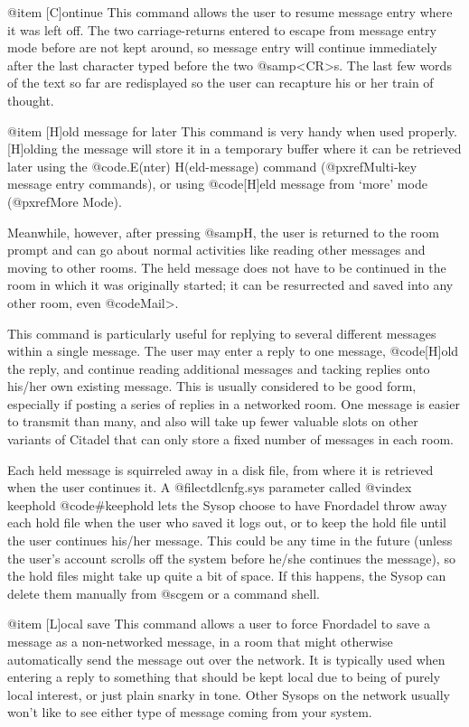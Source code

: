 @item [C]ontinue
This command allows the user to resume message entry
where it was left off.  The two carriage-returns entered to
escape from message entry mode before are not kept around,
so message entry will continue immediately after the last
character typed before the two @samp{<CR>}s.  The last few words of
the text so far are redisplayed so the user can recapture
his or her train of thought.

@item [H]old message for later
This command is very handy when used properly.
[H]olding the message
will store it in a temporary buffer where it can be retrieved
later using the @code{.E(nter) H(eld-message)} command (@pxref{Multi-key
message entry commands}), or using @code{[H]eld message} from `more' mode
(@pxref{More Mode}).

Meanwhile, however, after pressing @samp{H}, the user is
returned to the room prompt and can go about normal activities
like reading other messages and moving to other rooms.  The
held message does not have to be continued in the room in
which it was originally started; it can be resurrected and
saved into any other room, even @code{Mail>}.

This command is particularly useful for replying to
several different messages within a single message.  The user
may enter a reply to one message, @code{[H]old} the reply, and
continue reading additional messages and tacking replies
onto his/her own existing message.  This is usually considered to
be good form, especially if posting a series of replies in a
networked room.  One message is easier to transmit than many,
and also will take up fewer valuable slots on other variants of Citadel
that can only store a fixed number of messages in each room.

Each held message is squirreled away in a disk file,
from where it is retrieved when the user continues it.  A
@file{ctdlcnfg.sys} parameter called
@vindex keephold
@code{#keephold} lets the Sysop
choose to have Fnordadel throw away each hold file when the
user who saved it logs out, or to keep the hold file until
the user continues his/her message.  This could be any time in
the future (unless the user's account scrolls off the system
before he/she continues the message), so the hold files might
take up quite a bit of space.  If this happens, the Sysop can
delete them manually from @sc{gem} or a command shell.

@item [L]ocal save
This command allows a user to force Fnordadel to
save a message as a non-networked message, in a room that
might otherwise automatically send the message out over the
network.  It is typically used when entering a reply to
something that should be kept local due to being of purely
local interest, or just plain snarky in tone.  Other
Sysops on the network usually won't like to see either type
of message coming from your system.

